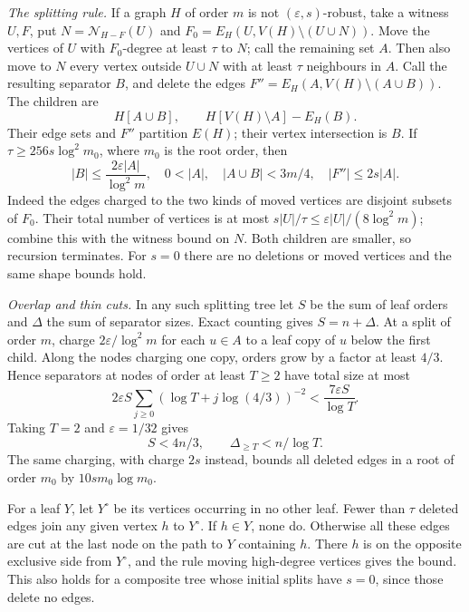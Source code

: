 \documentclass[11pt]{article}
\theoremstyle{remark}\newtheorem*{remark}{Remark}
\newcommand{\eps}{\varepsilon}
\newcommand{\NN}{\mathcal N}
\begin{document}
\emph{The splitting rule.}
If a graph $H$ of order $m$ is not $(\eps,s)$-robust, take a witness
$U,F$, put $N=\NN_{H-F}(U)$ and
$F_0=E_H(U,V(H)\setminus(U\cup N))$.
Move the vertices of $U$ with $F_0$-degree at least $\tau$ to $N$;
call the remaining set $A$. Then also move to $N$ every vertex outside
$U\cup N$ with at least $\tau$ neighbours in $A$.
Call the resulting separator $B$, and delete the edges
$F''=E_H(A,V(H)\setminus(A\cup B))$.
The children are
\[
 H[A\cup B],\qquad H[V(H)\setminus A]-E_H(B).
\]
Their edge sets and $F''$ partition $E(H)$; their vertex intersection is $B$.
If $\tau\ge256s\log^2m_0$, where $m_0$ is the root order, then
\begin{equation}\label{eq:splitshape}
 |B|\le\frac{2\eps|A|}{\log^2m},\quad
 0<|A|,\quad |A\cup B|<3m/4,\quad |F''|\le2s|A|.
\end{equation}
Indeed the edges charged to the two kinds of moved vertices are disjoint
subsets of $F_0$. Their total number of vertices is at most
$s|U|/\tau\le\eps|U|/(8\log^2m)$; combine this with the witness bound
on $N$. Both children are smaller, so recursion terminates. For $s=0$
there are no deletions or moved vertices and the same shape bounds hold.

\emph{Overlap and thin cuts.}
In any such splitting tree let $S$ be the sum of leaf orders and
$\Delta$ the sum of separator sizes. Exact counting gives $S=n+\Delta$.
At a split of order $m$, charge $2\eps/\log^2m$ for each $u\in A$
to a leaf copy of $u$ below the first child. Along the nodes charging
one copy, orders grow by a factor at least $4/3$. Hence separators at
nodes of order at least $T\ge2$ have total size at most
\[
 2\eps S\sum_{j\ge0}(\log T+j\log(4/3))^{-2}
 <\frac{7\eps S}{\log T}.
\]
Taking $T=2$ and $\eps=1/32$ gives
\begin{equation}\label{eq:overlap}
 S<4n/3,\qquad \Delta_{\ge T}<n/\log T.
\end{equation}
The same charging, with charge $2s$ instead, bounds all deleted edges
in a root of order $m_0$ by $10sm_0\log m_0$.

For a leaf $Y$, let $Y^\circ$ be its vertices occurring in no other leaf.
Fewer than $\tau$ deleted edges join any given vertex $h$ to $Y^\circ$.
If $h\in Y$, none do. Otherwise all these edges are cut at the last
node on the path to $Y$ containing $h$. There $h$ is on the opposite
exclusive side from $Y^\circ$, and the rule moving high-degree vertices
gives the bound. This also holds for a composite tree whose initial
splits have $s=0$, since those delete no edges.
\end{document}
